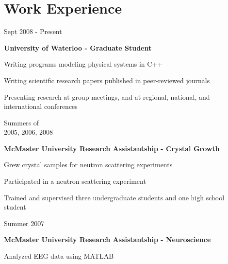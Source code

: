 \documentclass[letterpaper]{article}
\renewenvironment{itemize}{
  \begin{list}{}{
    \setlength{\leftmargin}{1.5em}
  }
}{
  \end{list}
}
\begin{document}
\section*{Work Experience}
\begin{itemize}
\item 
	\begin{minipage}[t]{0.23\linewidth}
 	Sept 2008 - Present 
	\end{minipage}
	\begin{minipage}[t]{0.72\linewidth}
	{\bf University of Waterloo - Graduate Student}
		\begin{itemize}
		\item Writing programs modeling physical systems in C++
		\item Writing scientific research papers published in peer-reviewed journals
		\item Presenting research at group meetings, and at regional, national, and international conferences
		\end{itemize}
\end{minipage}
\item 
	\begin{minipage}[t]{0.23\linewidth}
 	Summers of\\
	2005, 2006, 2008
	\end{minipage}
	\begin{minipage}[t]{0.77\linewidth}
	{\bf McMaster University Research Assistantship - Crystal Growth}
		\begin{itemize}
		\item Grew crystal samples for neutron scattering experiments
		\item Participated in a neutron scattering experiment
		\item Trained and supervised three undergraduate students and one high school student
		\end{itemize}
\end{minipage}
\item 
	\begin{minipage}[t]{0.23\linewidth}
 	Summer 2007
	\end{minipage}
	\begin{minipage}[t]{0.72\linewidth}
	{\bf McMaster University Research Assistantship - Neuroscience}
		\begin{itemize}
		\item Analyzed EEG data using MATLAB
		\end{itemize}
\end{minipage}
\end{itemize}
\end{document}
